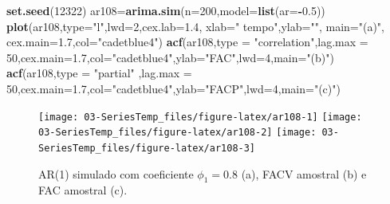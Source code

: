\documentclass[
]{book}
\newenvironment{Shaded}{\begin{snugshade}}{\end{snugshade}}
\newcommand{\DataTypeTok}[1]{\textcolor[rgb]{0.13,0.29,0.53}{#1}}
\newcommand{\DecValTok}[1]{\textcolor[rgb]{0.00,0.00,0.81}{#1}}
\newcommand{\FloatTok}[1]{\textcolor[rgb]{0.00,0.00,0.81}{#1}}
\newcommand{\KeywordTok}[1]{\textcolor[rgb]{0.13,0.29,0.53}{\textbf{#1}}}
\newcommand{\NormalTok}[1]{#1}
\newcommand{\OperatorTok}[1]{\textcolor[rgb]{0.81,0.36,0.00}{\textbf{#1}}}
\newcommand{\StringTok}[1]{\textcolor[rgb]{0.31,0.60,0.02}{#1}}
\theoremstyle{definition}
\theoremstyle{definition}
\theoremstyle{definition}
\theoremstyle{remark}
\begin{document}
\begin{Shaded}
\begin{Highlighting}[]
\KeywordTok{set.seed}\NormalTok{(}\DecValTok{12322}\NormalTok{)}
\NormalTok{ar108=}\KeywordTok{arima.sim}\NormalTok{(}\DataTypeTok{n=}\DecValTok{200}\NormalTok{,}\DataTypeTok{model=}\KeywordTok{list}\NormalTok{(}\DataTypeTok{ar=}\OperatorTok{-}\FloatTok{0.5}\NormalTok{))}
\KeywordTok{plot}\NormalTok{(ar108,}\DataTypeTok{type=}\StringTok{"l"}\NormalTok{,}\DataTypeTok{lwd=}\DecValTok{2}\NormalTok{,}\DataTypeTok{cex.lab=}\FloatTok{1.4}\NormalTok{, }\DataTypeTok{xlab=}\StringTok{" tempo"}\NormalTok{,}\DataTypeTok{ylab=}\StringTok{""}\NormalTok{, }\DataTypeTok{main=}\StringTok{"(a)"}\NormalTok{, }\DataTypeTok{cex.main=}\FloatTok{1.7}\NormalTok{,}\DataTypeTok{col=}\StringTok{"cadetblue4"}\NormalTok{)}
\KeywordTok{acf}\NormalTok{(ar108,}\DataTypeTok{type =} \StringTok{"correlation"}\NormalTok{,}\DataTypeTok{lag.max =} \DecValTok{50}\NormalTok{,}\DataTypeTok{cex.main=}\FloatTok{1.7}\NormalTok{,}\DataTypeTok{col=}\StringTok{"cadetblue4"}\NormalTok{,}\DataTypeTok{ylab=}\StringTok{"FAC"}\NormalTok{,}\DataTypeTok{lwd=}\DecValTok{4}\NormalTok{,}\DataTypeTok{main=}\StringTok{"(b)"}\NormalTok{)}
\KeywordTok{acf}\NormalTok{(ar108,}\DataTypeTok{type =} \StringTok{"partial"}\NormalTok{ ,}\DataTypeTok{lag.max =} \DecValTok{50}\NormalTok{,}\DataTypeTok{cex.main=}\FloatTok{1.7}\NormalTok{,}\DataTypeTok{col=}\StringTok{"cadetblue4"}\NormalTok{,}\DataTypeTok{ylab=}\StringTok{"FACP"}\NormalTok{,}\DataTypeTok{lwd=}\DecValTok{4}\NormalTok{,}\DataTypeTok{main=}\StringTok{"(c)"}\NormalTok{)}
\end{Highlighting}
\end{Shaded}

\begin{figure}
\texttt{[image: 03-SeriesTemp\_files/figure-latex/ar108-1]} \texttt{[image: 03-SeriesTemp\_files/figure-latex/ar108-2]} \texttt{[image: 03-SeriesTemp\_files/figure-latex/ar108-3]} \caption{AR(1) simulado com coeficiente $\phi_1=0.8$ (a), FACV amostral (b) e FAC amostral (c).}\label{fig:ar108}
\end{figure}
\end{document}
